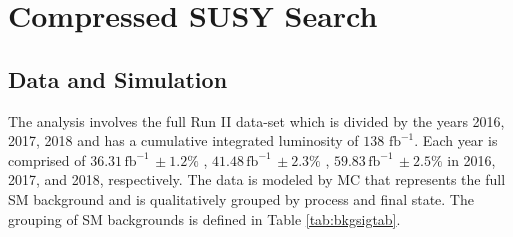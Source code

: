 
\setcounter{secnumdepth}{3}
\setcounter{tocdepth}{3}
\setlength{\parskip}{\smallskipamount}
\setlength{\parindent}{0pt}


\makeatletter


\providecommand{\tabularnewline}{\\}


\makeatother

%

\chapter{Compressed SUSY Search}


\section{ Data and Simulation}
The analysis involves the full Run II data-set which is divided by the years 2016, 2017, 2018 and has a cumulative integrated luminosity of $138 \, \, \text{fb}^{-1}$. Each year is comprised of $36.31 \, \text{fb}^{-1} \, \pm 1.2\%$ \cite{CMS:2021xjt}, $41.48 \, \text{fb}^{-1} \, \pm 2.3\%$ \cite{CMS:2018elu}, $59.83 \, \text{fb}^{-1} \, \pm2.5\%$ \cite{CMS:2019jhq} in 2016, 2017, and 2018, respectively. The data is modeled by MC that represents the full SM background and is qualitatively grouped by process and final state. The grouping of SM backgrounds is defined in Table \ref{tab:bkgsigtab}.

